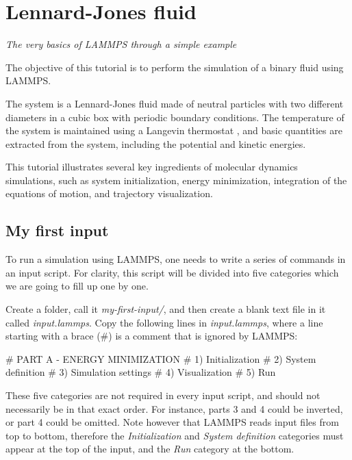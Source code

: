\chapter{Lennard-Jones fluid}
\label{lennard-jones-label}

\noindent \vspace{-1cm} \noindent \textcolor{graytitle}{\textit{{\Large The very basics of LAMMPS through a simple example}}\vspace{0.5cm} }

\vspace{0.25cm} \noindent The objective of this tutorial is to perform
the simulation of a binary fluid using LAMMPS.

\vspace{0.25cm} \noindent The system is a Lennard-Jones fluid made of neutral
particles with two different diameters in a cubic box with periodic
boundary conditions. The temperature of the system is maintained
using a Langevin thermostat \cite{schneider1978molecular}, and
basic quantities are extracted
from the system, including the potential and kinetic energies. 

\vspace{0.25cm} \noindent This tutorial illustrates several key ingredients of
molecular dynamics simulations, such as system initialization,
energy minimization, integration of the equations of motion,
and trajectory visualization.

\section{My first input}
\noindent To run a simulation using LAMMPS, one needs to
write a series of commands in an input script. For clarity,
this script will be divided into five categories which we are going to
fill up one by one. 

\vspace{0.25cm} \noindent Create a folder, call it \textit{my-first-input/}, and then create a blank
text file in it called \textit{input.lammps}. Copy the following lines
in \textit{input.lammps}, where a line starting with a brace ($\#$)
is a comment that is ignored by LAMMPS:

\begin{lcverbatim}
# PART A - ENERGY MINIMIZATION
# 1) Initialization
# 2) System definition
# 3) Simulation settings
# 4) Visualization
# 5) Run
\end{lcverbatim}

\noindent These five categories are not required in every
input script, and should not necessarily be in that
exact order. For instance, parts 3 and 4 could be inverted, or
part 4 could be omitted. Note however that LAMMPS reads input
files from top to bottom, therefore the \textit{Initialization} and 
\textit{System definition} categories must appear at the top of the
input, and the \textit{Run} category at the bottom.

